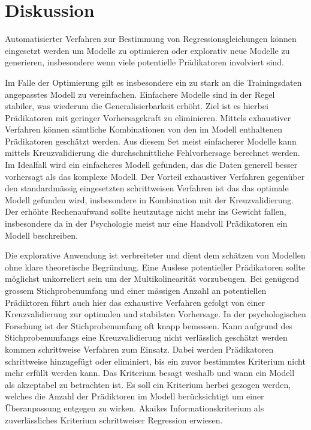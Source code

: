 \section{Diskussion}
Automatisierter Verfahren zur Bestimmung von Regressionsgleichungen können eingesetzt werden um Modelle zu optimieren oder explorativ neue Modelle zu generieren, insbesondere wenn viele potentielle Prädikatoren involviert sind. 

Im Falle der Optimierung gilt es insbesondere ein zu stark an die Trainingsdaten angepasstes Modell zu vereinfachen. 
Einfachere Modelle sind in der Regel stabiler, was wiederum die Generalisierbarkeit erhöht.
Ziel ist es hierbei Prädikatoren mit geringer Vorhersagekraft zu eliminieren. Mittels exhaustiver Verfahren können sämtliche Kombinationen von den im Modell enthaltenen Prädikatoren geschätzt werden.
Aus diesem Set meist einfacherer Modelle kann mittels Kreuzvalidierung die durchschnittliche Fehlvorhersage berechnet werden. Im Idealfall wird ein einfacheres Modell gefunden, das die Daten generell besser vorhersagt als das komplexe Modell.
Der Vorteil exhaustiver Verfahren gegenüber den standardmässig eingesetzten schrittweisen Verfahren ist das das optimale Modell gefunden wird, insbesondere in Kombination mit der Kreuzvalidierung.
Der erhöhte Rechenaufwand sollte heutzutage nicht mehr ins Gewicht fallen, insbesondere da in der Psychologie meist nur eine Handvoll Prädikatoren ein Modell beschreiben.  

Die explorative Anwendung ist verbreiteter und dient dem schätzen von Modellen ohne klare theoretische Begründung.
Eine Auslese potentieller Prädikatoren sollte möglichst unkorreliert sein um der Multikolinearität vorzubeugen. Bei genügend grossem Stichprobenumfang und einer mässigen Anzahl an potentiellen Prädiktoren führt auch hier das exhaustive Verfahren gefolgt von einer Kreuzvalidierung zur optimalen und stabilsten Vorhersage. In der psychologischen Forschung ist der Stichprobenumfang oft knapp bemessen. Kann aufgrund des Stichprobenumfangs eine Kreuzvalidierung nicht verlässlich geschätzt werden kommen schrittweise Verfahren zum Einsatz. Dabei werden Prädikatoren schrittweise hinzugefügt oder eliminiert, bis ein zuvor bestimmtes Kriterium nicht mehr erfüllt werden kann. Das Kriterium  besagt weshalb und wann ein Modell als akzeptabel zu betrachten ist.
Es soll ein Kriterium herbei gezogen werden, welches die Anzahl der Prädiktoren im Modell berücksichtigt um einer Überanpassung entgegen zu wirken.
Akaikes Informationskriterium als zuverlässliches Kriterium schrittweiser Regression erwiesen.  

